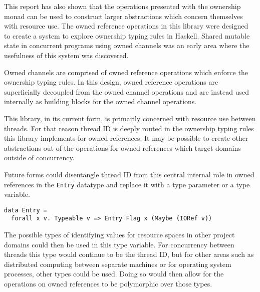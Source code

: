 \documentclass[onehalf,11pt]{beavtex}
\begin{document}
This report has also shown that the operations presented with the ownership
monad can be used to construct larger abstractions which concern themselves with
resource use. The owned reference operations in this library were designed to
create a system to explore ownership typing rules in Haskell.  Shared mutable
state in concurrent programs using owned channels was an early area where the
usefulness of this system was discovered.

Owned channels are comprised of owned reference operations which enforce the
ownership typing rules.
In this design, owned reference operations are superficially decoupled from the
owned channel operations and are instead used internally as building blocks for
the owned channel operations.

This library, in its current form, is primarily concerned with resource use
between threads.
For that reason thread ID is deeply routed in the ownership typing rules this
library implements for owned references. 
It may be possible to create other abstractions out of the operations for owned
references which target domains outside of concurrency.

Future forms could disentangle thread ID from this central internal role
in owned references in the \texttt{Entry} datatype and replace it with
a type parameter or a type variable.

\begin{verbatim}
data Entry =
  forall x v. Typeable v => Entry Flag x (Maybe (IORef v))
\end{verbatim}

The possible types of identifying values for resource spaces in other project
domains could then be used in this type variable.
For concurrency between threads this type would continue to be the thread ID,
but for other areas such as distributed computing between separate machines or
for operating system processes, other types could be used.
Doing so would then allow for the operations on owned references to be
polymorphic over those types.



{}

\end{document}
